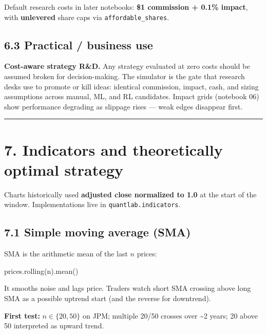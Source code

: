 \documentclass[
  11pt,
]{article}
\newenvironment{Shaded}{}{}
\newcommand{\NormalTok}[1]{#1}
\begin{document}
Default research costs in later notebooks: \textbf{\$1 commission +
0.1\% impact}, with \textbf{unlevered} share caps via
\texttt{affordable\_shares}.

\subsection{6.3 Practical / business
use}\label{practical-business-use-4}

\textbf{Cost-aware strategy R\&D.} Any strategy evaluated at zero costs
should be assumed broken for decision-making. The simulator is the gate
that research desks use to promote or kill ideas: identical commission,
impact, cash, and sizing assumptions across manual, ML, and RL
candidates. Impact grids (notebook 06) show performance degrading as
slippage rises --- weak edges disappear first.

\begin{center}\rule{0.5\linewidth}{0.5pt}\end{center}

\section{7. Indicators and theoretically optimal
strategy}\label{indicators-and-theoretically-optimal-strategy}

Charts historically used \textbf{adjusted close normalized to 1.0} at
the start of the window. Implementations live in
\texttt{quantlab.indicators}.

\subsection{7.1 Simple moving average
(SMA)}\label{simple-moving-average-sma}

SMA is the arithmetic mean of the last \(n\) prices:

\begin{Shaded}
\begin{Highlighting}[]
\NormalTok{prices.rolling(n).mean()}
\end{Highlighting}
\end{Shaded}

It smooths noise and lags price. Traders watch short SMA crossing above
long SMA as a possible uptrend start (and the reverse for downtrend).

\textbf{First test:} \(n \in \{20, 50\}\) on JPM; multiple 20/50 crosses
over \textasciitilde2 years; 20 above 50 interpreted as upward trend.
\end{document}
